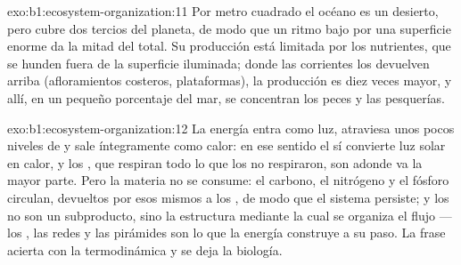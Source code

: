 \begin{solution}{exo:b1:ecosystem-organization:11}
Por metro cuadrado el océano es un desierto, pero cubre dos tercios del
planeta, de modo que un ritmo bajo por una superficie enorme da la mitad del
total. Su producción está limitada por los nutrientes, que se hunden fuera
de la superficie iluminada; donde las corrientes los devuelven arriba
(afloramientos costeros, plataformas), la producción es diez veces mayor, y
allí, en un pequeño porcentaje del mar, se concentran los peces y las
pesquerías.
\end{solution}

\begin{solution}{exo:b1:ecosystem-organization:12}
La energía entra como luz, atraviesa unos pocos niveles de  y sale
íntegramente como calor: en ese sentido el  sí convierte luz solar
en calor, y los , que respiran todo lo que los 
no respiraron, son adonde va la mayor parte. Pero la materia no se consume:
el carbono, el nitrógeno y el fósforo circulan, devueltos por esos mismos
 a los , de modo que el sistema persiste; y los
 no son un subproducto, sino la estructura mediante la cual se
organiza el flujo --- los , las redes y las pirámides son lo que la
energía construye a su paso. La frase acierta con la termodinámica y se deja
la biología.
\end{solution}

